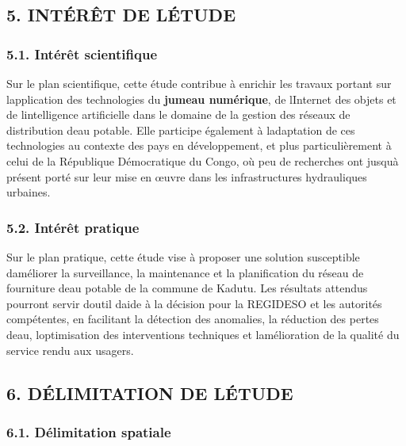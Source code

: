 \documentclass[12pt,a4paper,oneside]{report}
\begin{document}
\subsection{5. INTÉRÊT DE
L\textquotesingle ÉTUDE}\label{intuxe9ruxeat-de-luxe9tude}

\subsubsection{5.1. Intérêt
scientifique}\label{intuxe9ruxeat-scientifique}

Sur le plan scientifique, cette étude contribue à enrichir les travaux
portant sur l\textquotesingle application des technologies du
\textbf{jumeau numérique}, de l\textquotesingle Internet des objets et
de l\textquotesingle intelligence artificielle dans le domaine de la
gestion des réseaux de distribution d\textquotesingle eau potable. Elle
participe également à l\textquotesingle adaptation de ces technologies
au contexte des pays en développement, et plus particulièrement à celui
de la République Démocratique du Congo, où peu de recherches ont
jusqu\textquotesingle à présent porté sur leur mise en œuvre dans les
infrastructures hydrauliques urbaines.

\subsubsection{5.2. Intérêt pratique}\label{intuxe9ruxeat-pratique}

Sur le plan pratique, cette étude vise à proposer une solution
susceptible d\textquotesingle améliorer la surveillance, la maintenance
et la planification du réseau de fourniture d\textquotesingle eau
potable de la commune de Kadutu. Les résultats attendus pourront servir
d\textquotesingle outil d\textquotesingle aide à la décision pour la
REGIDESO et les autorités compétentes, en facilitant la détection des
anomalies, la réduction des pertes d\textquotesingle eau,
l\textquotesingle optimisation des interventions techniques et
l\textquotesingle amélioration de la qualité du service rendu aux
usagers.

\subsection{6. DÉLIMITATION DE
L\textquotesingle ÉTUDE}\label{duxe9limitation-de-luxe9tude}

\subsubsection{6.1. Délimitation
spatiale}\label{duxe9limitation-spatiale}
\end{document}
